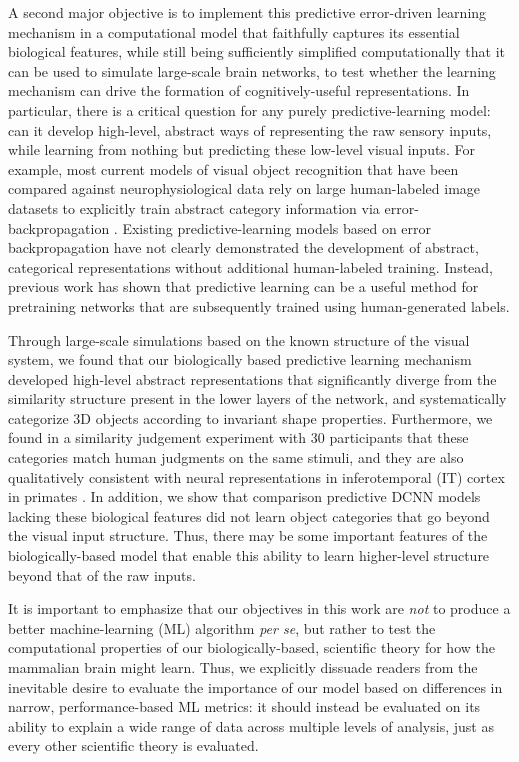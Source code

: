 \documentclass[11pt,twoside]{article}
\newif\myifpdf
\begin{document}
A second major objective is to implement this predictive error-driven learning mechanism in a computational model that faithfully captures its essential biological features, while still being sufficiently simplified computationally that it can be used to simulate large-scale brain networks, to test whether the learning mechanism can drive the formation of cognitively-useful representations.  In particular, there is a critical question for any purely predictive-learning model: can it develop high-level, abstract ways of representing the raw sensory inputs, while learning from nothing but predicting these low-level visual inputs.  For example, most current models of visual object recognition that have been compared against neurophysiological data rely on large human-labeled image datasets to explicitly train abstract category information via error-backpropagation \cite{CadieuHongYaminsEtAl14,RajalinghamIssaBashivanEtAl18}.  Existing predictive-learning models based on error backpropagation \cite{LotterKreimanCox16} have not clearly demonstrated the development of abstract, categorical representations without additional human-labeled training.  Instead, previous work has shown that predictive learning can be a useful method for pretraining networks that are subsequently trained using human-generated labels.

Through large-scale simulations based on the known structure of the visual system, we found that our biologically based predictive learning mechanism developed high-level abstract representations that significantly diverge from the similarity structure present in the lower layers of the network, and systematically categorize 3D objects according to invariant shape properties.  Furthermore, we found in a similarity judgement experiment with 30  participants that these categories match human judgments on the same stimuli, and they are also qualitatively consistent with neural representations in inferotemporal (IT) cortex in primates \cite{CadieuHongYaminsEtAl14}.  In addition, we show that comparison predictive DCNN models lacking these biological features \cite{LotterKreimanCox16} did not learn object categories that go beyond the visual input structure.  Thus, there may be some important features of the biologically-based model that enable this ability to learn higher-level structure beyond that of the raw inputs.

It is important to emphasize that our objectives in this work are \emph{not} to produce a better machine-learning (ML) algorithm \emph{per se}, but rather to test the computational properties of our biologically-based, scientific theory for how the mammalian brain might learn.  Thus, we explicitly dissuade readers from the inevitable desire to evaluate the importance of our model based on differences in narrow, performance-based ML metrics: it should instead be evaluated on its ability to explain a wide range of data across multiple levels of analysis, just as every other scientific theory is evaluated.
\end{document}
